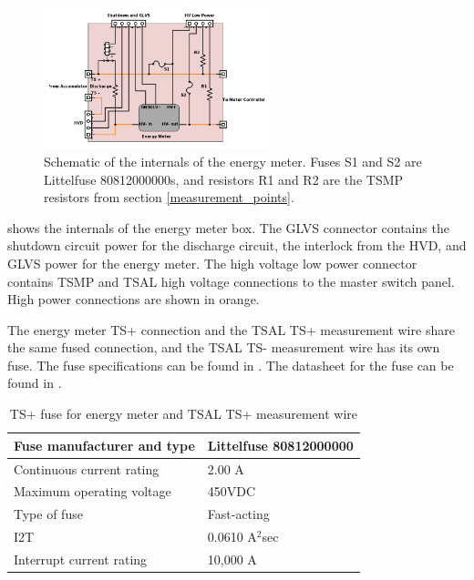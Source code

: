 \documentclass{article}
\begin{document}
\begin{figure}[H]
\centering
\includegraphics[width=0.6\textwidth]{Energy-Meter-Schematic-w-HVD.png}
\caption{Schematic of the internals of the energy meter. Fuses S1 and S2 are Littelfuse 80812000000s, and resistors R1 and R2 are the TSMP resistors from section \ref{measurement_points}.}
\label{fig:energy_meter_schematic}
\end{figure}

 shows the internals of the energy meter box. The GLVS connector contains the shutdown circuit power for the discharge circuit, the interlock from the HVD, and GLVS power for the energy meter. The high voltage low power connector contains TSMP and TSAL high voltage connections to the master switch panel. High power connections are shown in orange.

The energy meter TS+ connection and the TSAL TS+ measurement wire share the same fused connection, and the TSAL TS- measurement wire has its own fuse. The fuse specifications can be found in . The datasheet for the fuse can be found in .

\begin{table}[H]
	\centering
	\begin{tabular}{|l|l|}
	\hline
	Fuse manufacturer and type & Littelfuse 80812000000 \\ \hline
	Continuous current rating & 2.00 A \\ \hline
	Maximum operating voltage & 450VDC \\ \hline
	Type of fuse & Fast-acting \\ \hline
	I2T & 0.0610 A$^{2}$sec \\ \hline
	Interrupt current rating & 10,000 A \\ \hline
	\end{tabular}
	\caption{TS+ fuse for energy meter and TSAL TS+ measurement wire}
	\label{tab:TSAL_and_EM_fuse}
\end{table}
\end{document}
